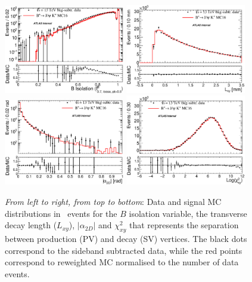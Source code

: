 %
\begin{figure}[!b]
\begin{center}
\hspace*{-0.4cm}
\includegraphics[width=0.47\textwidth]{figures/InternalNote_DataMCComparison/Bp/bplus_iso.eps}
\hspace*{-0.4cm}
\includegraphics[width=0.47\textwidth]{figures/InternalNote_DataMCComparison/Bp/bplus_Lxy.eps}\\
\hspace*{-0.4cm}
\includegraphics[width=0.47\textwidth]{figures/InternalNote_DataMCComparison/Bp/bplus_a2D.eps}
\hspace*{-0.4cm}
\includegraphics[width=0.47\textwidth]{figures/InternalNote_DataMCComparison/Bp/bplus_chi2PVSV.eps}
\caption{{\it{From left to right, from top to bottom}}: 
Data and signal MC distributions in \BpKpJpsi\ events for the $B$ isolation variable, 
the transverse decay length ($L_{xy}$), $|\alpha_{2D}|$ and 
$\chi^{2}_{xy}$ that represents the separation between production
(PV) and decay (SV) vertices.
The black dots correspond to the sideband subtracted data, while 
the red points correspond to reweighted MC
normalised to the number of data events.}
\label{fig:maincompBp}
\end{center}
\end{figure}
